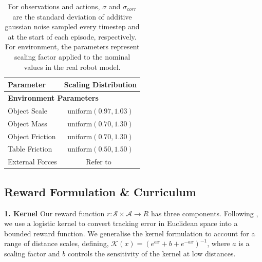 \documentclass[letterpaper, 10 pt, conference]{ieeeconf}  %
\begin{document}
\begin{table}[!t]
\begin{subtable}[h]{0.8\linewidth}
{\begin{sc}
\begin{tabular}{l|c}
            \toprule
            \rowcolor[HTML]{CBCEFB}
            Parameter & Scaling Distribution \\
            \midrule
            \multicolumn{2}{l}{\textbf{Environment Parameters}} \\
            \rowcolor[HTML]{EFEFEF} 
            \hspace*{0.5cm} Object Scale & $ \textrm{uniform}(0.97, 1.03)$ \\
            \hspace*{0.5cm} Object Mass & $ \textrm{uniform}(0.70, 1.30)$ \\
            \rowcolor[HTML]{EFEFEF} 
            \hspace*{0.5cm} Object Friction & $ \textrm{uniform}(0.70, 1.30)$ \\
            \hspace*{0.5cm} Table Friction & $ \textrm{uniform}(0.50, 1.50)$ \\
            \rowcolor[HTML]{EFEFEF} 
            \hspace*{0.5cm} External Forces & Refer to~\cite[pp.~9]{openai-sh} \\
            \bottomrule
            \end{tabular}
            \end{sc}
        }
     \end{subtable}
     \vspace{2pt}
     \caption{For observations and actions, $\sigma$ and $\sigma_{corr}$ are the standard deviation of additive gaussian noise sampled every timestep and at the start of each episode, respectively.  For environment, the parameters represent scaling factor applied to the nominal values in the real robot model.
     }
     \label{tab:dr}
\end{table}



\subsection{Reward Formulation \& Curriculum}
\label{sec:reward}
\noindent \textbf{1. Kernel} Our reward function $r: \mathcal S \times \mathcal A \to R$ has three components. Following \citep{Hwangbo_2019}, we use a logistic kernel to convert tracking error in Euclidean space into a bounded reward function. We generalise the kernel formulation to account for a range of distance scales, defining, $\mathcal{K}(x) = \left(e^{ax} + b + e^{-ax}\right)^{-1}$, where $a$ is a scaling factor and $b$ controls the sensitivity of the kernel at low distances.
\end{document}

